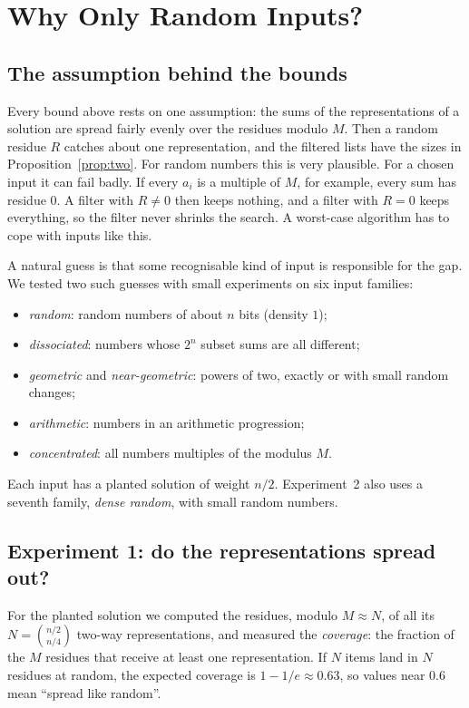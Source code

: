 \documentclass[conference]{IEEEtran}
\begin{document}
\section{Why Only Random Inputs?}\label{sec:probes}

\subsection{The assumption behind the bounds}
Every bound above rests on one assumption: the sums of the representations of
a solution are spread fairly evenly over the residues modulo $M$. Then a random
residue $R$ catches about one representation, and the filtered lists have the
sizes in Proposition~\ref{prop:two}. For random numbers this is very plausible.
For a chosen input it can fail badly. If every $a_i$ is a multiple of $M$, for
example, every sum has residue $0$. A filter with $R\ne0$ then keeps nothing,
and a filter with $R=0$ keeps everything, so the filter never shrinks the
search. A worst-case algorithm has to cope with inputs like this.

A natural guess is that some recognisable kind of input is responsible for the
gap. We tested two such guesses with small experiments on six input families:
\begin{itemize}
\item \emph{random}: random numbers of about $n$ bits (density $1$);
\item \emph{dissociated}: numbers whose $2^n$ subset sums are all different;
\item \emph{geometric} and \emph{near-geometric}: powers of two, exactly or with
small random changes;
\item \emph{arithmetic}: numbers in an arithmetic progression;
\item \emph{concentrated}: all numbers multiples of the modulus $M$.
\end{itemize}
Each input has a planted solution of weight $n/2$. Experiment~2 also uses a
seventh family, \emph{dense random}, with small random numbers.

\subsection{Experiment 1: do the representations spread out?}
For the planted solution we computed the residues, modulo $M\approx N$, of all
its $N=\binom{n/2}{n/4}$ two-way representations, and measured the
\emph{coverage}: the fraction of the $M$ residues that receive at least one
representation. If $N$ items land in $N$ residues at random, the expected
coverage is $1-1/e\approx0.63$, so values near $0.6$ mean ``spread like
random''.
\end{document}

